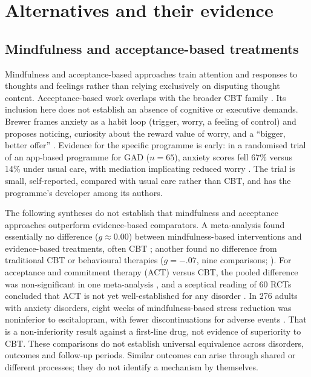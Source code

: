 \section{Alternatives and their evidence}\label{sec:alternatives}
\subsection{Mindfulness and acceptance-based treatments}
Mindfulness and acceptance-based approaches train attention and responses to thoughts and feelings rather than relying exclusively on disputing thought content.
Acceptance-based work overlaps with the broader CBT family \citep{hayes2006act}.
Its inclusion here does not establish an absence of cognitive or executive demands.
Brewer frames anxiety as a habit loop (trigger, worry, a feeling of control) and proposes noticing, curiosity about the reward value of worry, and a ``bigger, better offer'' \citep{brewer2021unwinding}.
Evidence for the specific programme is early: in a randomised trial of an app-based programme for GAD ($n=65$), anxiety scores fell 67\% versus 14\% under usual care, with mediation implicating reduced worry \citep{roy2021app}.
The trial is small, self-reported, compared with usual care rather than CBT, and has the programme's developer among its authors.

The following syntheses do not establish that mindfulness and acceptance approaches outperform evidence-based comparators.
A meta-analysis found essentially no difference ($g\approx0.00$) between mindfulness-based interventions and evidence-based treatments, often CBT \citep{goldberg2018mbi}; another found no difference from traditional CBT or behavioural therapies ($g=-.07$, nine comparisons; \citealt{khoury2013mindfulness}).
For acceptance and commitment therapy (ACT) versus CBT, the pooled difference was non-significant in one meta-analysis \citep{atjak2015act}, and a sceptical reading of 60 RCTs concluded that ACT is not yet well-established for any disorder \citep{ost2014act}.
In 276 adults with anxiety disorders, eight weeks of mindfulness-based stress reduction was noninferior to escitalopram, with fewer discontinuations for adverse events \citep{hoge2023mbsr}.
That is a non-inferiority result against a first-line drug, not evidence of superiority to CBT.
These comparisons do not establish universal equivalence across disorders, outcomes and follow-up periods.
Similar outcomes can arise through shared or different processes; they do not identify a mechanism by themselves.

